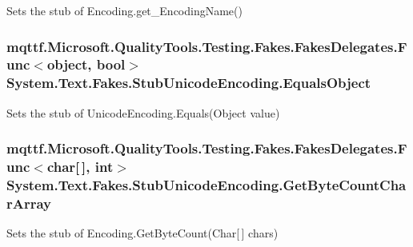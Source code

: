 Sets the stub of Encoding.\-get\-\_\-\-Encoding\-Name()

\hypertarget{class_system_1_1_text_1_1_fakes_1_1_stub_unicode_encoding_a0152e4508b9dbc55a37e98208b2dbd25}{
\subsubsection[{Equals\-Object}]{\setlength{\rightskip}{0pt plus 5cm}mqttf.\-Microsoft.\-Quality\-Tools.\-Testing.\-Fakes.\-Fakes\-Delegates.\-Func$<$object, bool$>$ System.\-Text.\-Fakes.\-Stub\-Unicode\-Encoding.\-Equals\-Object}}\label{class_system_1_1_text_1_1_fakes_1_1_stub_unicode_encoding_a0152e4508b9dbc55a37e98208b2dbd25}


Sets the stub of Unicode\-Encoding.\-Equals(\-Object value)

\hypertarget{class_system_1_1_text_1_1_fakes_1_1_stub_unicode_encoding_a63b4c3c7e833b1d30402d7caa669ad05}{
\subsubsection[{Get\-Byte\-Count\-Char\-Array}]{\setlength{\rightskip}{0pt plus 5cm}mqttf.\-Microsoft.\-Quality\-Tools.\-Testing.\-Fakes.\-Fakes\-Delegates.\-Func$<$char\mbox{[}$\,$\mbox{]}, int$>$ System.\-Text.\-Fakes.\-Stub\-Unicode\-Encoding.\-Get\-Byte\-Count\-Char\-Array}}\label{class_system_1_1_text_1_1_fakes_1_1_stub_unicode_encoding_a63b4c3c7e833b1d30402d7caa669ad05}


Sets the stub of Encoding.\-Get\-Byte\-Count(\-Char\mbox{[}$\,$\mbox{]} chars)

